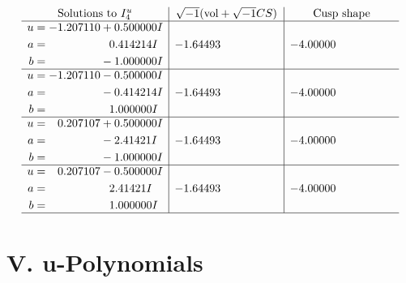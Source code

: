 \documentclass[1p]{elsarticle_modified}
\theoremstyle{definition}
\newcommand{\I}{\sqrt{-1}}
\begin{document}
$$\begin{array}{c|c|c}  
\text{Solutions to }I^u_{4}& \I (\text{vol} + \sqrt{-1}CS) & \text{Cusp shape}\\
 \hline 
\begin{aligned}
u &= -1.207110 + 0.500000 I \\
a &= \phantom{-0.000000 -}0.414214 I \\
b &= \phantom{-0.000000 } -1.000000 I\end{aligned}
 & -1.64493\phantom{ +0.000000I} & -4.00000\phantom{ +0.000000I} \\ \hline\begin{aligned}
u &= -1.207110 - 0.500000 I \\
a &= \phantom{-0.000000 } -0.414214 I \\
b &= \phantom{-0.000000 -}1.000000 I\end{aligned}
 & -1.64493\phantom{ +0.000000I} & -4.00000\phantom{ +0.000000I} \\ \hline\begin{aligned}
u &= \phantom{-}0.207107 + 0.500000 I \\
a &= \phantom{-0.000000 } -2.41421 I \\
b &= \phantom{-0.000000 } -1.000000 I\end{aligned}
 & -1.64493\phantom{ +0.000000I} & -4.00000\phantom{ +0.000000I} \\ \hline\begin{aligned}
u &= \phantom{-}0.207107 - 0.500000 I \\
a &= \phantom{-0.000000 -}2.41421 I \\
b &= \phantom{-0.000000 -}1.000000 I\end{aligned}
 & -1.64493\phantom{ +0.000000I} & -4.00000\phantom{ +0.000000I}\\
 \hline 
 \end{array}$$\newpage
\newpage\renewcommand{\arraystretch}{1}
\centering \section*{ V. u-Polynomials}
\end{document}
